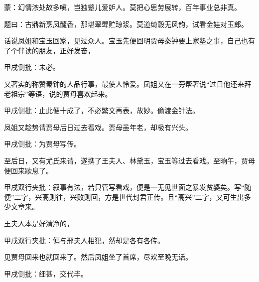 
\begin{parag}
    \begin{note}蒙：幻情浓处故多嗔，岂独颦儿爱妒人。莫把心思劳展转，百年事业总非真。\end{note}
\end{parag}


\begin{parag}
    题曰：古鼎新烹凤髓香，那堪翠斝贮琼浆。莫道绮縠无风韵，试看金娃对玉郎。
\end{parag}


\begin{parag}
    话说凤姐和宝玉回家，见过众人。宝玉先便回明贾母秦钟要上家塾之事，自己也有了个伴读的朋友，正好发奋，\begin{note}甲戌侧批：未必。\end{note}又著实的称赞秦钟的人品行事，最使人怜爱。凤姐又在一旁帮著说“过日他还来拜老祖宗”等语，说的贾母喜欢起来。\begin{note}甲戌侧批：止此便十成了，不必繁文再表，故妙。偷渡金针法。\end{note}凤姐又趁势请贾母后日过去看戏。贾母虽年老，却极有兴头。\begin{note}甲戌侧批：为贾母写传。\end{note}至后日，又有尤氏来请，遂携了王夫人、林黛玉，宝玉等过去看戏。至晌午，贾母便回来歇息了。\begin{note}甲戌双行夹批：叙事有法，若只管写看戏，便是一无见世面之暴发贫婆矣。写“随便”二字，兴高则往，兴败则回，方是世代封君正传。且“高兴”二字，又可生出多少文章来。\end{note}王夫人本是好清净的，\begin{note}甲戌双行夹批：偏与邢夫人相犯，然却是各有各传。\end{note}见贾母回来也就回来了。然后凤姐坐了首席，尽欢至晚无话。\begin{note}甲戌侧批：细甚，交代毕。\end{note}
\end{parag}


